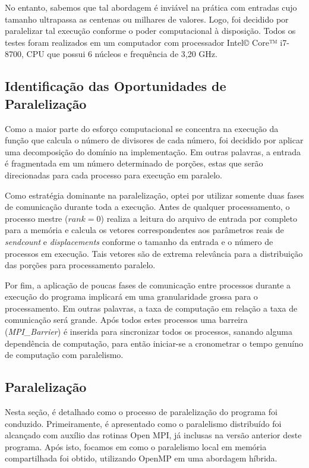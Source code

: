 \documentclass[a4paper, 12pt]{article}
\begin{document}
No entanto, sabemos que tal abordagem é inviável na prática com entradas cujo tamanho ultrapassa as centenas ou milhares de valores. Logo, foi decidido por paralelizar tal execução conforme o poder computacional à disposição. Todos os testes foram realizados em um computador com processador Intel© Core™ i7-8700, CPU que possui 6 núcleos e frequência de 3,20 GHz.

\subsection{Identificação das Oportunidades de Paralelização}

Como a maior parte do esforço computacional se concentra na execução da função que calcula o número de divisores de cada número, foi decidido por aplicar uma decomposição do domínio na implementação. Em outras palavras, a entrada é fragmentada em um número determinado de porções, estas que serão direcionadas para cada processo para execução em paralelo.

Como estratégia dominante na paralelização, optei por utilizar somente duas fases de comunicação durante toda a execução. Antes de qualquer processamento, o processo mestre (\(rank = 0\)) realiza a leitura do arquivo de entrada por completo para a memória e calcula os vetores correspondentes aos parâmetros reais de \emph{sendcount} e \emph{displacements} conforme o tamanho da entrada e o número de processos em execução. Tais vetores são de extrema relevância para a distribuição das porções para processamento paralelo.

Por fim, a aplicação de poucas fases de comunicação entre processos durante a execução do programa implicará em uma granularidade grossa para o processamento. Em outras palavras, a taxa de computação em relação a taxa de comunicação será grande. Após todos estes processos uma barreira (\emph{MPI\_Barrier}) é inserida para sincronizar todos os processos, sanando alguma dependência de computação, para então iniciar-se a cronometrar o tempo genuíno de computação com paralelismo. 

\subsection{Paralelização}

Nesta seção, é detalhado como o processo de paralelização do programa foi conduzido. Primeiramente, é apresentado como o paralelismo distribuído foi alcançado com auxílio das rotinas Open MPI, já inclusas na versão anterior deste programa. Após isto, focamos em como o paralelismo local em memória compartilhada foi obtido, utilizando OpenMP em uma abordagem híbrida.
\end{document}

